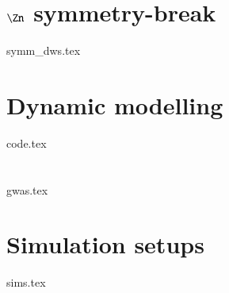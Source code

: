 




\section{\(\Zn\) symmetry-break}\label{sec:PT:symm_dws}
    {{symm_dws.tex}}


\section{Dynamic modelling}\label{sec:PT:code} %
    {{code.tex}}


\section{}\label{sec:PT:gwas}
    {{gwas.tex}}


\section{Simulation setups}\label{sec:PT:sims}
    {{sims.tex}}





